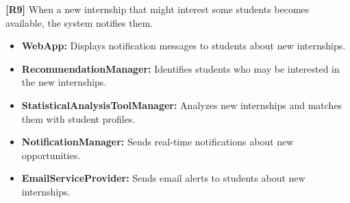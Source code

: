 \textbf{[R9]} When a new internship that might interest some students becomes available, the system notifies them.  
\begin{itemize}
    \item \textbf{WebApp:} Displays notification messages to students about new internships.
    \item \textbf{RecommendationManager:} Identifies students who may be interested in the new internships.
    \item \textbf{StatisticalAnalysisToolManager:} Analyzes new internships and matches them with student profiles.
    \item \textbf{NotificationManager:} Sends real-time notifications about new opportunities.
    \item \textbf{EmailServiceProvider:} Sends email alerts to students about new internships.
\end{itemize}



